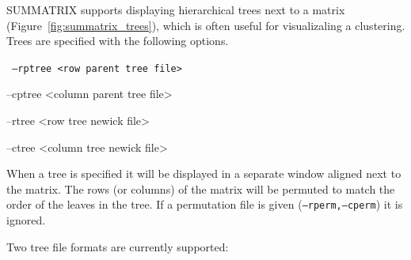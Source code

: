 \documentclass[12pt]{article}
\newcommand{\code}[1]{{\tt #1}}
\newcommand{\figref}[1]{Figure~\ref{#1}}
\begin{document}
SUMMATRIX supports displaying hierarchical trees next to a matrix 
(\figref{fig:summatrix_trees}), which is often useful for visualizaling
a clustering.  
Trees are specified with the following options.

\code{
  --rptree <row parent tree file>

  --cptree <column parent tree file>

  --rtree <row tree newick file>

  --ctree <column tree newick file>  
}

When a tree is specified it will be displayed in a separate window aligned next
to the matrix.  The rows (or columns) of the matrix will be permuted to match
the order of the leaves in the tree.  If a permutation file is given
(\code{--rperm,--cperm}) it is ignored.

Two tree file formats are currently supported:
\end{document}
